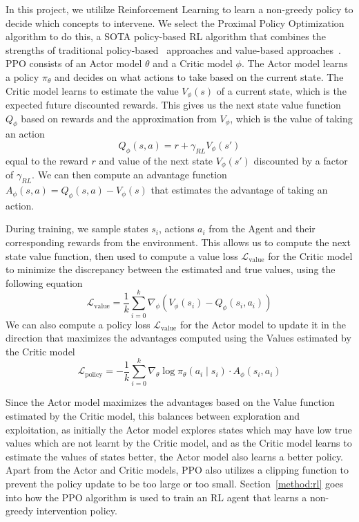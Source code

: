 In this project, we utililze Reinforcement Learning 
to learn a non-greedy policy to decide which
concepts to intervene. We select
 the Proximal Policy Optimization~\cite{ppo}
algorithm to do this, a SOTA policy-based RL algorithm that 
combines the strengths of traditional policy-based~\cite{trpo}
approaches
and value-based approaches~\cite{deep-q-learning, deep-q-learning-2}.
PPO consists of an Actor model $\theta$ and a Critic model $\phi$.
The Actor model learns a policy $\pi_\theta$ and decides on what actions to take based on 
the current state.
The Critic model learns 
to estimate the value $V_\phi(s)$ of a current state, 
which is the expected future discounted rewards.
This gives us the next state value function $Q_\phi$ 
based on rewards
and the approximation from $V_\phi$,
which is the value of taking an action \[Q_\phi(s,a) = 
r + \gamma_{RL} V_\phi(s')\] 
equal to the reward $r$ and value 
of the next state $V_\phi(s')$ discounted by a factor of $\gamma_{RL}$.
We can then compute
an advantage function $A_\phi(s,a) = Q_\phi(s,a) - V_\phi(s)$
that estimates the advantage of taking an action.

During training, we sample states $s_i$, actions $a_i$ from the Agent
and their corresponding
rewards from the environment. This allows us to compute 
the next state value function,
then used to compute a value loss $\mathcal{L}_{\text{value}}$ for the Critic model
to minimize the discrepancy between the estimated and true
values, using the following equation
\[\mathcal{L}_{\text{value}} = \frac{1}{k} \sum_{i=0}^k 
\nabla_\phi (V_\phi(s_i) - Q_\phi(s_i,a_i))\]
We can also compute a policy loss $\mathcal{L}_{\text{value}}$ for the Actor model
to update it in the direction that maximizes the advantages
computed using the Values estimated by the Critic model
\[\mathcal{L}_{\text{policy}} = -\frac{1}{k} \sum_{i = 0}^k \nabla_\theta \log
 \pi_\theta(a_i \mid s_i) \cdot A_\phi(s_i, a_i)\]

Since the Actor model
maximizes the advantages based on the Value function
estimated by the Critic model,
this balances between exploration and exploitation,
as initially the Actor model explores states which may have low true values
which are not learnt by the Critic model, and as the Critic model
learns to estimate the values of states better, the Actor model also 
learns a better policy. Apart from the Actor and Critic models,
PPO also utilizes
a clipping function to prevent the policy update 
to be too large or too small.
Section~\ref{method:rl} goes into how
the PPO algorithm is used to train an RL agent that learns 
a non-greedy intervention policy.
 
